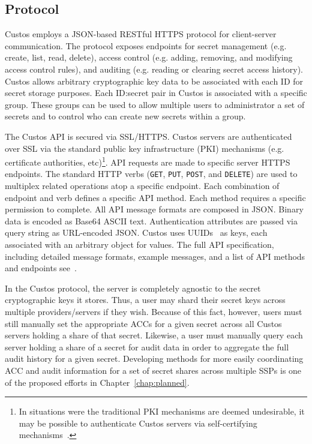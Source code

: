\subsection{Protocol}

Custos employs a JSON-based RESTful HTTPS protocol for client-server
communication. The protocol exposes endpoints for secret management
(e.g. create, list, read, delete), access control (e.g. adding,
removing, and modifying access control rules), and auditing
(e.g. reading or clearing secret access history). Custos allows
arbitrary cryptographic key data to be associated with each ID for
secret storage purposes. Each ID:secret pair in Custos is associated
with a specific group. These groups can be used to allow multiple
users to administrator a set of secrets and to control who can create
new secrets within a group.

The Custos API is secured via SSL/HTTPS. Custos servers are
authenticated over SSL via the standard public key infrastructure
(PKI) mechanisms (e.g. certificate authorities, etc)\footnote{In
  situations were the traditional PKI mechanisms are deemed
  undesirable, it may be possible to authenticate Custos servers via
  self-certifying mechanisms~\cite{ellison1996, mazieres1999}.}. API
requests are made to specific server HTTPS endpoints. The standard
HTTP verbs (\texttt{GET}, \texttt{PUT}, \texttt{POST}, and
\texttt{DELETE}) are used to multiplex related operations atop a
specific endpoint. Each combination of endpoint and verb defines a
specific API method. Each method requires a specific permission to
complete. All API message formats are composed in JSON. Binary data is
encoded as Base64 ASCII text. Authentication attributes are passed via
query string as URL-encoded JSON. Custos uses UUIDs~\cite{leach2005}
as keys, each associated with an arbitrary object for values. The full
API specification, including detailed message formats, example
messages, and a list of API methods and endpoints
see~\cite{custos-masters}.

In the Custos protocol, the server is completely agnostic to the
secret cryptographic keys it stores. Thus, a user may shard their
secret keys across multiple providers/servers if they wish. Because of
this fact, however, users must still manually set the appropriate ACCs
for a given secret across all Custos servers holding a share of that
secret. Likewise, a user must manually query each server holding a
share of a secret for audit data in order to aggregate the full audit
history for a given secret. Developing methods for more easily
coordinating ACC and audit information for a set of secret shares
across multiple SSPs is one of the proposed efforts in
Chapter~\ref{chap:planned}.

